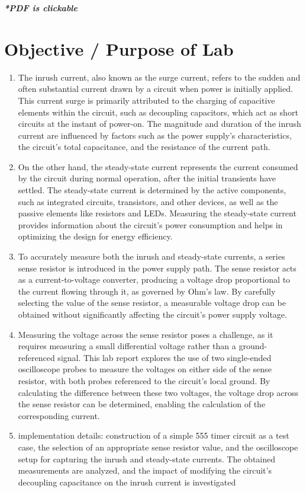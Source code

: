 \documentclass[a4paper,11pt]{article}%
\begin{document}


\pagebreak

\tableofcontents
\listoffigures
\listoftables
\vfill
\begin{center}
	\textbf{\textit{*PDF is clickable}}
\end{center}

\pagebreak

\section{Objective / Purpose of Lab}
\begin{enumerate}
	\item The inrush current, also known as the surge current, refers to the sudden and often substantial current drawn by a circuit when power is initially applied. This current surge is primarily attributed to the charging of capacitive elements within the circuit, such as decoupling capacitors, which act as short circuits at the instant of power-on. The magnitude and duration of the inrush current are influenced by factors such as the power supply's characteristics, the circuit's total capacitance, and the resistance of the current path.
	\item On the other hand, the steady-state current represents the current consumed by the circuit during normal operation, after the initial transients have settled. The steady-state current is determined by the active components, such as integrated circuits, transistors, and other devices, as well as the passive elements like resistors and LEDs. Measuring the steady-state current provides information about the circuit's power consumption and helps in optimizing the design for energy efficiency.
	\item To accurately measure both the inrush and steady-state currents, a series sense resistor is introduced in the power supply path. The sense resistor acts as a current-to-voltage converter, producing a voltage drop proportional to the current flowing through it, as governed by Ohm's law. By carefully selecting the value of the sense resistor, a measurable voltage drop can be obtained without significantly affecting the circuit's power supply voltage.
	\item Measuring the voltage across the sense resistor poses a challenge, as it requires measuring a small differential voltage rather than a ground-referenced signal. This lab report explores the use of two single-ended oscilloscope probes to measure the voltages on either side of the sense resistor, with both probes referenced to the circuit's local ground. By calculating the difference between these two voltages, the voltage drop across the sense resistor can be determined, enabling the calculation of the corresponding current.
	\item 	implementation details: construction of a simple 555 timer circuit as a test case, the selection of an appropriate sense resistor value, and the oscilloscope setup for capturing the inrush and steady-state currents. The obtained measurements are analyzed, and the impact of modifying the circuit's decoupling capacitance on the inrush current is investigated
\end{enumerate}
\end{document}
